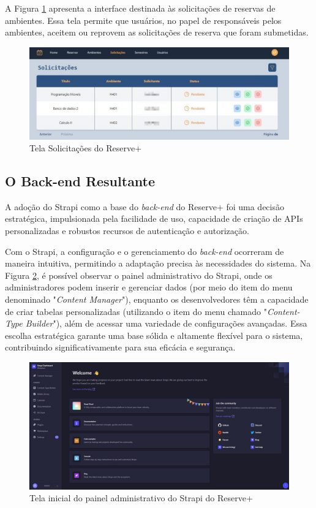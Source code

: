 \documentclass[12pt]{article}
\begin{document}
A Figura \ref{fig:tela_solicitacoes} apresenta a interface destinada às solicitações de reservas de ambientes. Essa tela permite que usuários, no papel de responsáveis pelos ambientes, aceitem ou reprovem as solicitações de reserva que foram submetidas.

\begin{figure}[ht]
\centering
\includegraphics[width=1.0\textwidth]{tela_solicitacoes.jpg}
\caption{Tela Solicitações do Reserve+}
\label{fig:tela_solicitacoes}
\end{figure}

\subsection{O Back-end Resultante} \label{sec:back_end_resultante}

A adoção do Strapi como a base do \textit{back-end} do Reserve+ foi uma decisão estratégica, impulsionada pela facilidade de uso, capacidade de criação de APIs personalizadas e robustos recursos de autenticação e autorização.

Com o Strapi, a configuração e o gerenciamento do \textit{back-end} ocorreram de maneira intuitiva, permitindo a adaptação precisa às necessidades do sistema. Na Figura \ref{fig:strapi}, é possível observar o painel administrativo do Strapi, onde os administradores podem inserir e gerenciar dados (por meio do item do menu denominado "\textit{Content Manager}"), enquanto os desenvolvedores têm a capacidade de criar tabelas personalizadas (utilizando o item do menu chamado "\textit{Content-Type Builder}"), além de acessar uma variedade de configurações avançadas. Essa escolha estratégica garante uma base sólida e altamente flexível para o sistema, contribuindo significativamente para sua eficácia e segurança.

\begin{figure}[ht]
\centering
\includegraphics[width=1.0\textwidth]{strapi.jpg}
\caption{Tela inicial do painel administrativo do Strapi do Reserve+}
\label{fig:strapi}
\end{figure}
\end{document}
